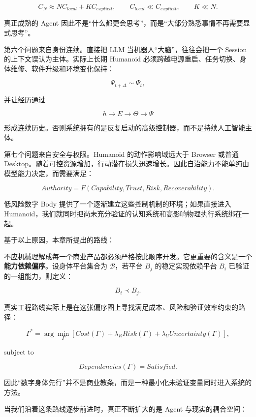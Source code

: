 $$
C_N
\approx
N C_{local}
+
K C_{explicit},
\qquad
C_{local}\ll C_{explicit},
\qquad
K\ll N.
$$

真正成熟的 Agent 因此不是“什么都更会思考”，而是“大部分熟悉事情不再需要显式思考”。

第六个问题来自身份连续。直接把 LLM 当机器人“大脑”，往往会把一个 Session 的上下文误认为主体。实际上长期 Humanoid 必须跨越电源重启、任务切换、身体维修、软件升级和环境变化保持：

$$
\Psi_{t+\Delta}\sim\Psi_t,
$$

并让经历通过

$$
h\rightarrow E\rightarrow\Theta\rightarrow\Psi
$$

形成连续历史。否则系统拥有的是反复启动的高级控制器，而不是持续人工智能主体。

第七个问题来自安全与权限。Humanoid 的动作影响域远大于 Browser 或普通 Desktop。随着可控资源增加，行动潜在损失迅速增长。因此自治能力不能单纯由模型能力决定，而需要满足：

$$
Authority
=
F(Capability,Trust,Risk,Recoverability).
$$

低风险数字 Body 提供了一个逐渐建立这些控制机制的环境；如果直接进入 Humanoid，我们就同时把尚未充分验证的认知系统和高影响物理执行系统绑在一起。

基于以上原因，本章所提出的路线：

\begin{statementbox}
\centering
{}
\end{statementbox}

不应机械理解成每一个商业产品都必须严格按此顺序开发。它更重要的含义是一个\textbf{能力依赖偏序}。设身体平台集合为 $\mathcal B$，若平台 $B_j$ 的稳定实现依赖平台 $B_i$ 已验证的一组能力，则定义：

$$
B_i\prec B_j.
$$

真实工程路线实际上是在这张偏序图上寻找满足成本、风险和验证效率约束的路径：

$$
\Gamma^*
=
\arg\min_{\Gamma}
\left[
Cost(\Gamma)
+\lambda_R Risk(\Gamma)
+\lambda_U Uncertainty(\Gamma)
\right],
$$

subject to

$$
Dependencies(\Gamma)=Satisfied.
$$

因此“数字身体先行”并不是商业教条，而是一种最小化未验证变量同时进入系统的方法。

当我们沿着这条路线逐步前进时，真正不断扩大的是 Agent 与现实的耦合空间：

